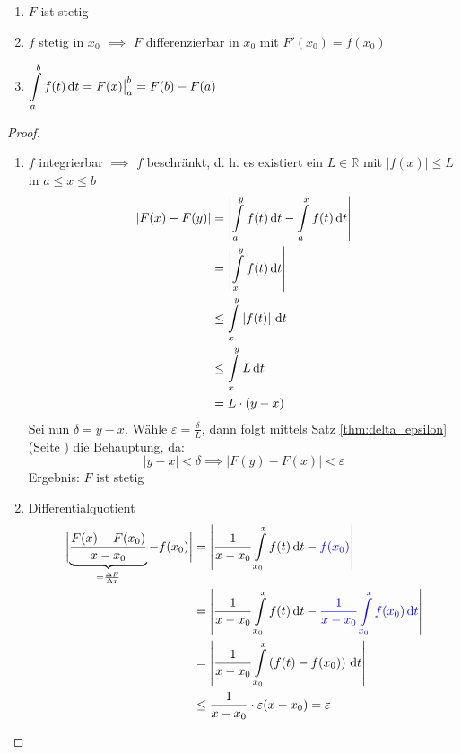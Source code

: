 \begin{theorem}
  \begin{enumerate}
    \item $F$ ist stetig
    \item $f$ stetig in $x_0$ $\implies$ $F$ differenzierbar in $x_0$ mit $F'(x_0) = f(x_0)$
    \item $\displaystyle \int\limits_a^b f(t)\,\mathrm d t = F(x)\big|_a^b = F(b) - F(a)$
  \end{enumerate}
\end{theorem}

\begin{proof}
  \begin{enumerate}
    \item $f$ integrierbar $\implies$ $f$ beschränkt, d. h. es existiert ein $L \in \mathbb R$ mit $\left|f(x)\right| \leq L$ in $a\leq x \leq b$
      \begin{align*}
        \left| F(x) - F(y) \right| &= \left| \int\limits_a^y f(t)\,\mathrm d t - \int\limits_a^x f(t)\,\mathrm d t \right|\\
        &= \left| \int\limits_x^y f(t)\,\mathrm d t \right |\\
        &\leq \int\limits_x^y \left| f(t) \right| \,\mathrm d t\\
        &\leq \int\limits_x^y L\,\mathrm d t\\
        &= L\cdot (y-x)
      \end{align*}
      Sei nun $\delta = y-x$. Wähle $\varepsilon = \frac \delta L$, dann folgt mittels Satz \ref{thm:delta_epsilon} (Seite \pageref{thm:delta_epsilon}) die Behauptung, da:
      \[ \left| y - x \right| < \delta \implies \left| F(y) - F(x) \right| < \varepsilon \]
      Ergebnis: $F$ ist stetig
    \item Differentialquotient
      \begin{align*}
        \biggl| \underbrace{\frac{F(x)-F(x_0)}{x-x_0}}_{= \frac{\Delta F}{\Delta x}} - f(x_0) \biggr|
        &= \left| \frac{1}{x-x_0} \int\limits_{x_0}^x f(t)\,\mathrm d t - \textcolor{blue}{f(x_0)} \right|\\
        &= \left| \frac{1}{x-x_0} \int\limits_{x_0}^x f(t)\,\mathrm d t - \textcolor{blue}{\frac 1 {x-x_0} \int\limits_{x_0}^x f(x_0)\,\mathrm d t} \right| \\
        &= \left| \frac{1}{x-x_0} \int\limits_{x_0}^x \left( f(t) - f(x_0) \right) \,\mathrm d t \right| \\
        &\leq \frac{1}{x-x_0} \cdot \varepsilon (x-x_0) = \varepsilon
      \end{align*}
  \end{enumerate}
\end{proof}

